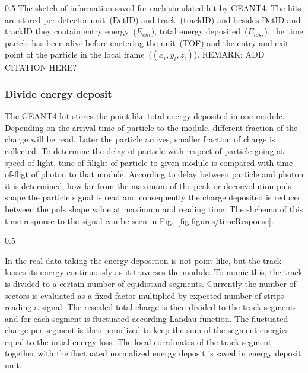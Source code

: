                  {0.5}       %
                 { The sketch of information saved for each simulated hit by GEANT4. The hits are stored per detector unit~(DetID) and track~(trackID) and besides DetID and trackID they contain entry energy~($E_{ent}$), total energy deposited~($E_{loss}$), the time paricle has been alive before enetering the unit~(TOF) and the entry and exit point of the particle in the local frame~($(x_{i},y_{i},z_{i})$). REMARK: ADD CITATION HERE?}

\subsubsection{Divide energy deposit}

The GEANT4 hit stores the point-like total energy deposited in one module. Depending on the arrival time of particle to the module, different fraction of the charge will be read. Later the particle arrives, smaller fraction of charge is collected. To determine the delay of particle with respect of particle going at speed-of-light, time of filight of particle to given module is compared with time-of-fligt of photon to that module. According to delay between particle and photon it is determined, how far from the maximum of the  peak or deconvolution puls shape the particle signal is read and consequently the charge deposited is reduced between the puls shape value at maximum and reading time. The shchema of this time response to the signal can be seen in Fig.~\ref{fig:figures/timeResponse}.


                 {0.5}       %
                 { }

In the real data-taking the energy deposition is not point-like, but the track looses its energy continuously as it traverses the module. To mimic this, the track is divided to a certain number of equdistand segments. Currently the number of sectors is evaluated as a fixed factor multiplied by expected number of strips reading a signal. The rescaled total charge is then divided to the track segments and for each segment is fluctuated according Landau function. The fluctuated charge per segment is then nomrlized to keep the sum of the segment energies equal to the intial energy loss. The local corrdinates of the track segment together with the fluctuated normalized energy deposit is saved in energy deposit unit.



